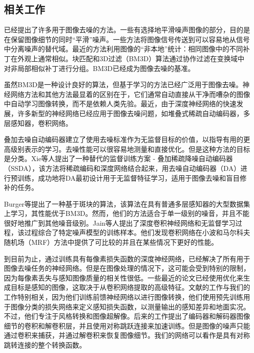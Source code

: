 \subsection{相关工作}
已经提出了许多用于图像去噪的方法。一些有选择地平滑噪声图像的部分，目的是在保留图像细节的同时“平滑”噪声。一些方法将图像信号传送到可以容易地从信号中分离噪声的替代域。最近的方法利用图像的“非本地”统计：相同图像中的不同补丁在外观上通常相似。块匹配和3D过滤（BM3D）算法\cite{Dabov2007}通过协作过滤在变换域中对非局部相似补丁进行分组。BM3D已经成为图像去噪的基准。

虽然BM3D是一种设计良好的算法，但基于学习的方法已经广泛用于图像去噪。神经网络方法和其他方法最显着的区别在于，它们通常自动直接从干净而嘈杂的图像中自动学习图像转换，而不是依赖人类先验。最近，由于深度神经网络的快速发展，许多新型的神经网络已经应用于图像去噪问题，如堆叠式稀疏自动编码器\cite{Vincent2008,Xie2012,Agostinelli2013,Technologii2013a,Skribtsov2016}，多层感知器\cite{Burger2012,Wang2014a}，卷积网络\cite{Jain2009,Wu2014,Zhao2015,Mao2016,Eigen2013,Wu2014relu,Wang2015g}。

叠加去噪自动编码器\cite{Vincent2008}建立了使用去噪标准作为无监督目标的价值，以指导有用的更高级别表示的学习。去噪性能可以很容易地测量和直接优化。但是这种方法的目标是分类。Xie等人提出了一种替代的监督训练方案 - 叠加稀疏降噪自动编码器（SSDA），该方法将稀疏编码和深度网络结合起来，用去噪自动编码器（DA）进行预训练，成功地将DA最初设计用于无监督特征学习，适用于图像去噪和盲目修补的任务。

Burger等\cite{Burger2012}提出了一种基于斑块的算法，该算法在具有普通多层感知器的大型数据集上学习，其性能优于BM3D。然而，他们的方法适合于单一级别的噪音，并且不能很好地推广到其他噪音级别。Jain等人\cite{Jain2009}提出了深度卷积神经网络和无监督学习过程，该过程综合了特定噪声模型的训练样本。他们发现卷积网络在小波和马尔科夫随机场（MRF）方法中提供了可比较的并且在某些情况下更好的性能。

到目前为止，通过训练具有每像素损失函数的深度神经网络，已经解决了所有用于图像去噪任务的神经网络。但是在图像处理的情况下，这可能会受到特别的限制，因为每像素丢失与感知图像质量的相关性很低\cite{Zhao2015}。一些最近的论文已经使用优化来生成目标是感知的图像，这取决于从卷积网络提取的高级特征\cite{Dosovitskiy2016}。文献的工作与我们的工作特别相关，因为他们训练前馈神经网络以进行图像转换，他们使用预先训练用于图像分类的损失网络来定义感知损失函数，以测量输出的感知差异和地面实况。不过，他们专注于风格转换和图像超解像。后来的工作提出了编码器和解码器图像细节的卷积和解卷积层，并且使用对称跳跃连接来加速训练。但是图像的噪声只能通过卷积来捕获，并通过解卷积来恢复图像细节。我们的网络可以看作是具有对称跳转连接的整个转换函数。

